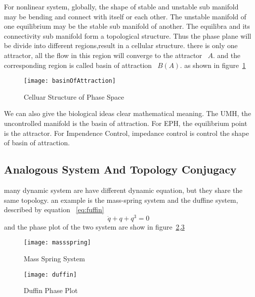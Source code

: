 For nonlinear system, globally, the shape of stable and unstable sub manifold may be bending and connect with itself or each other.
The unstable manifold of one equilibrium may be the stable sub manifold of another.
The equilibra and its connectivity sub manifold form a topological structure.
Thus the phase plane will be divide into different regions,result in a cellular structure.
there is only one attractor, all the flow in this region will converge to the attractor ~$A$.
and the corresponding region is called basin of attraction ~$B(A)$.
as shown in figure~\ref{fig:manyboa}
\begin{figure}
\begin{center}
\texttt{[image: basinOfAttraction]}
\end{center}
\caption{Celluar Structure of Phase Space}
\label{fig:manyboa}
\end{figure}


We can also give the biological ideas clear mathematical meaning.
The UMH, the uncontrolled manifold is the basin of attraction.
For EPH, the equilibrium point is the attractor.
For Impendence Control, impedance control is control the shape of basin of attraction.

\subsection{Analogous System And Topology Conjugacy}
many dynamic system are have different dynamic equation, but they share the same topology.
an example is the mass-spring system and the duffine system, described by equation ~\ref{eq:fuffin}
\begin{equation}
\label{eq:duffin}
\ddot{q}+q+q^{3}=0
\end{equation}
and the phase plot of the two system are show in figure~\ref{fig:msphaseplot},\ref{fig:duffin}

\begin{figure}
\begin{center}
\texttt{[image: massspring]}
\end{center}
\caption{Mass Spring System}
\label{fig:msphaseplot}
\end{figure}

\begin{figure}
\begin{center}
\texttt{[image: duffin]}
\end{center}
\caption{Duffin Phase Plot}
\label{fig:duffin}
\end{figure}


